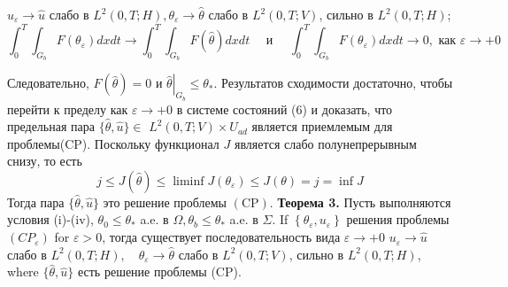    $u_{\varepsilon} \rightarrow \widehat{u}$ слабо в
    $L^{2}(0, T ; H), \theta_{\varepsilon} \rightarrow \widehat{\theta}$ слабо в $L^{2}(0, T ; V)$,
    сильно в $L^{2}(0, T ; H)$;
    \[
        \int_{0}^{T} \int_{G_{b}} F\left(\theta_{\varepsilon}\right) d x d t \rightarrow \int_{0}^{T}
        \int_{G_{b}} F(\widehat{\theta}) dx dt \quad \text { и } \quad \int_{0}^{T} \int_{G_{b}}
        F\left(\theta_{\varepsilon}\right) dx dt \rightarrow 0, \text { как } \varepsilon \rightarrow+0
    \]

    Следовательно, $F(\widehat{\theta})=0$ и $\left.\widehat{\theta}\right|_{G_{b}} \leq \theta_{*}$.
    Результатов сходимости достаточно, чтобы перейти к пределу как $\varepsilon \rightarrow+0$
    в системе состояний (6) и доказать, что предельная пара
    $\{\widehat{\theta}, \widehat{u}\} \in$ $L^{2}(0, T ; V) \times U_{a d}$
    является приемлемым для проблемы(CP).
    Поскольку функционал $J$ является слабо полунепрерывным снизу, то есть
    \[
        j \leq J(\widehat{\theta}) \leq \liminf J\left(\theta_{\varepsilon}\right) \leq J(\theta)=j=\inf J
    \]
    Тогда пара $\{\widehat{\theta}, \widehat{u}\}$ это решение проблемы $(\mathrm{CP})$.
    \textbf{Теорема 3.} Пусть выполняются условия (i)-(iv),
    $\theta_{0} \leq \theta_{*}$ a.e. в $\Omega, \theta_{b} \leq \theta_{*}$ a.e. в
    $\Sigma$. If $\left\{\theta_{\varepsilon}, u_{\varepsilon}\right\}$  решения проблемы
    $\left(C P_{\varepsilon}\right)$ for $\varepsilon>0$, тогда существует последовательность вида
    $\varepsilon \rightarrow+0$ $u_{\varepsilon} \rightarrow \widehat{u}$ слабо в
    $L^{2}(0, T ; H), \quad \theta_{\varepsilon} \rightarrow \widehat{\theta}$ слабо в $L^{2}(0, T ; V)$,
    сильно в $L^{2}(0, T ; H)$, where $\{\widehat{\theta}, \widehat{u}\}$ есть решение проблемы (CP).
